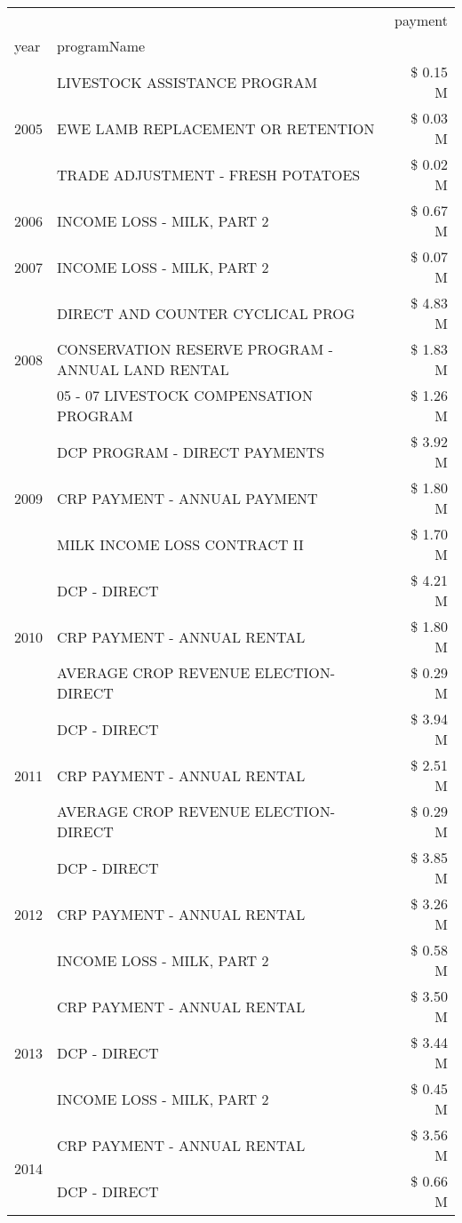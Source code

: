 \begin{tabular}{llr}
\toprule
 &  & payment \\
year & programName &  \\
\midrule
\multirow[t]{3}{*}{2005} & LIVESTOCK ASSISTANCE PROGRAM & \$ 0.15 M \\
 & EWE LAMB REPLACEMENT OR RETENTION & \$ 0.03 M \\
 & TRADE ADJUSTMENT - FRESH POTATOES & \$ 0.02 M \\
\cline{1-3}
2006 & INCOME LOSS - MILK, PART 2 & \$ 0.67 M \\
\cline{1-3}
2007 & INCOME LOSS - MILK, PART 2 & \$ 0.07 M \\
\cline{1-3}
\multirow[t]{3}{*}{2008} & DIRECT AND COUNTER CYCLICAL PROG & \$ 4.83 M \\
 & CONSERVATION RESERVE PROGRAM - ANNUAL LAND RENTAL & \$ 1.83 M \\
 & 05 - 07 LIVESTOCK COMPENSATION PROGRAM & \$ 1.26 M \\
\cline{1-3}
\multirow[t]{3}{*}{2009} & DCP PROGRAM - DIRECT PAYMENTS & \$ 3.92 M \\
 & CRP PAYMENT - ANNUAL PAYMENT & \$ 1.80 M \\
 & MILK INCOME LOSS CONTRACT II & \$ 1.70 M \\
\cline{1-3}
\multirow[t]{3}{*}{2010} & DCP - DIRECT & \$ 4.21 M \\
 & CRP PAYMENT - ANNUAL RENTAL & \$ 1.80 M \\
 & AVERAGE CROP REVENUE ELECTION-DIRECT & \$ 0.29 M \\
\cline{1-3}
\multirow[t]{3}{*}{2011} & DCP - DIRECT & \$ 3.94 M \\
 & CRP PAYMENT - ANNUAL RENTAL & \$ 2.51 M \\
 & AVERAGE CROP REVENUE ELECTION-DIRECT & \$ 0.29 M \\
\cline{1-3}
\multirow[t]{3}{*}{2012} & DCP - DIRECT & \$ 3.85 M \\
 & CRP PAYMENT - ANNUAL RENTAL & \$ 3.26 M \\
 & INCOME LOSS - MILK, PART 2 & \$ 0.58 M \\
\cline{1-3}
\multirow[t]{3}{*}{2013} & CRP PAYMENT - ANNUAL RENTAL & \$ 3.50 M \\
 & DCP - DIRECT & \$ 3.44 M \\
 & INCOME LOSS - MILK, PART 2 & \$ 0.45 M \\
\cline{1-3}
\multirow[t]{3}{*}{2014} & CRP PAYMENT - ANNUAL RENTAL & \$ 3.56 M \\
 & DCP - DIRECT & \$ 0.66 M \\

\end{tabular}
